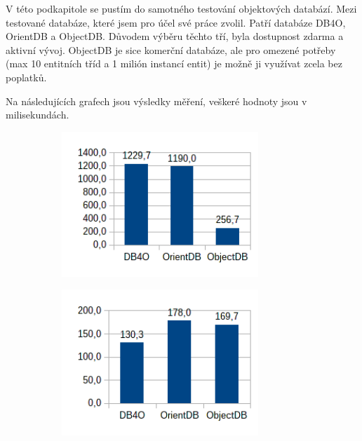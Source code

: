 V této podkapitole se pustím do samotného testování objektových databází. Mezi testované databáze, které jsem pro účel své práce zvolil. Patří databáze DB4O, OrientDB a ObjectDB. Důvodem výběru těchto tří, byla dostupnost zdarma a aktivní vývoj. ObjectDB je sice komerční databáze, ale pro omezené potřeby (max 10 entitních tříd a 1 milión instancí entit) je možně ji využívat zcela bez poplatků.

Na následujících grafech jsou výsledky měření, veškeré hodnoty jsou v milisekundách.
\begin{figure}[!h]
\begin{subfigure}[b]{0.5\textwidth}
\includegraphics[width=20em]{obr/bench/oodbms1}
\end{subfigure}
\begin{subfigure}[b]{0.5\textwidth}
\includegraphics[width=20em]{obr/bench/oodbms2}
\end{subfigure}
\end{figure}


